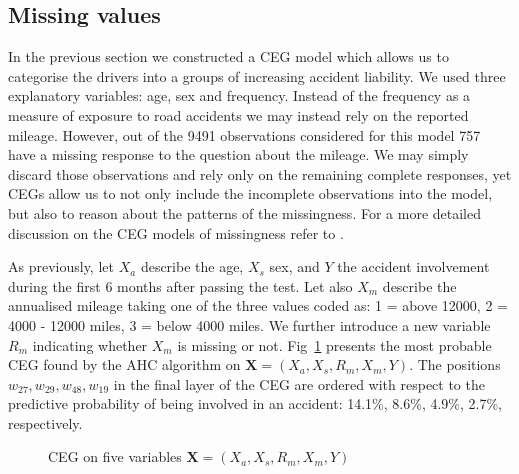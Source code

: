 \documentclass[runningheads]{llncs}
\begin{document}
\subsection{Missing values}\label{subsec:missing}
In the previous section we constructed a CEG model which allows us to categorise the drivers into a groups of increasing accident liability. We used three explanatory variables: age, sex and frequency. Instead of the frequency as a measure of exposure to road accidents we may instead rely on the reported mileage. However, out of the 9491 observations considered for this model 757 have a missing response to the question about the mileage. We may simply discard those observations and rely only on the remaining complete responses, yet CEGs allow us to not only include the incomplete observations into the model, but also to reason about the patterns of the missingness. For a more detailed discussion on the CEG models of missingness refer to \cite{barclay2014missingness}. 

As previously, let $X_a$ describe the age, $X_s$ sex, and $Y$ the accident involvement during the first 6 months after passing the test. Let also $X_m$ describe the annualised mileage taking one of the three values coded as:  1 = above 12000, 2 = 4000 - 12000 miles, 3 = below 4000 miles. We further introduce a new variable $R_m$ indicating whether $X_m$ is missing or not. Fig~\ref{ceg:mis-miles} presents the most probable CEG found by the AHC algorithm on $\boldsymbol{X} = (X_a, X_s, R_m, X_m, Y)$. The positions $w_{27}, w_{29}, w_{48}, w_{19}$ in the final layer of the CEG are ordered with respect to the predictive probability of being involved in an accident: 14.1\%, 8.6\%, 4.9\%, 2.7\%, respectively.
\begin{figure}
\centering

\caption{CEG on five variables $\boldsymbol{X} = (X_a, X_s, R_m, X_m, Y)$}
\label{ceg:mis-miles}
\end{figure}
\end{document}
